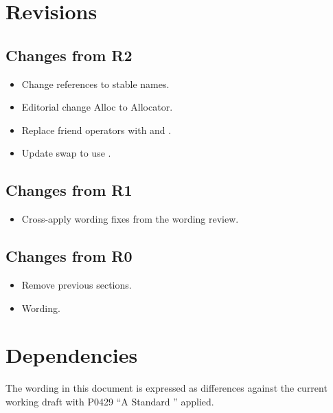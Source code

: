 \section{Revisions}

\subsection{Changes from R2}

\begin{itemize}
  \item Change references to stable names.
  \item Editorial change Alloc to Allocator.
  \item Replace friend operators with  and .
  \item Update swap to use .
\end{itemize}

\subsection{Changes from R1}

\begin{itemize}
  \item Cross-apply wording fixes from the  wording review.
\end{itemize}

\subsection{Changes from R0}

\begin{itemize}
  \item Remove previous sections.
  \item Wording.
\end{itemize}

\section{Dependencies}

The wording in this document is expressed as differences against the current
working draft with P0429 ``A Standard '' applied.
